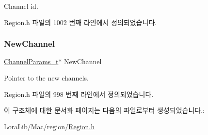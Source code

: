 Channel id. 

Region.\+h 파일의 1002 번째 라인에서 정의되었습니다.

\mbox{\label{structs_new_channel_req_params_afc31493a105479490228fd896b20b45c}} 
\subsubsection{\texorpdfstring{New\+Channel}{NewChannel}}
{\footnotesize\ttfamily \mbox{\hyperlink{group___l_o_r_a_m_a_c_ga1360ca6f82c6d125ea43a9dad9b56184}{Channel\+Params\+\_\+t}}$\ast$ New\+Channel}

Pointer to the new channels. 

Region.\+h 파일의 998 번째 라인에서 정의되었습니다.



이 구조체에 대한 문서화 페이지는 다음의 파일로부터 생성되었습니다.\+:\begin{DoxyCompactItemize}
\item 
Lora\+Lib/\+Mac/region/\mbox{\hyperlink{_region_8h}{Region.\+h}}\end{DoxyCompactItemize}
